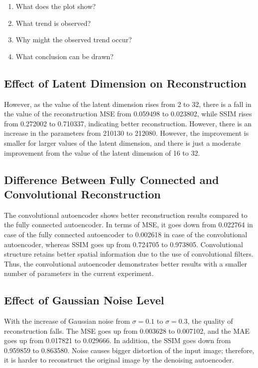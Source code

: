 \documentclass[10pt]{article}
\begin{document}
\begin{enumerate}
\item What does the plot show?
\item What trend is observed?
\item Why might the observed trend occur?
\item What conclusion can be drawn?
\end{enumerate}


\subsection*{Effect of Latent Dimension on Reconstruction}
However, as the value of the latent dimension rises from 2 to 32, there is a fall in the value of the reconstruction MSE from 0.059498 to 0.023802, while SSIM rises from 0.272002 to 0.710337, indicating better reconstruction. However, there is an increase in the parameters from 210130 to 212080. However, the improvement is smaller for larger values of the latent dimension, and there is just a moderate improvement from the value of the latent dimension of 16 to 32.

\subsection*{Difference Between Fully Connected and Convolutional Reconstruction}
The convolutional autoencoder shows better reconstruction results compared to the fully connected autoencoder. In terms of MSE, it goes down from 0.022764 in case of the fully connected autoencoder to 0.002618 in case of the convolutional autoencoder, whereas SSIM goes up from 0.724705 to 0.973805. Convolutional structure retains better spatial information due to the use of convolutional filters. Thus, the convolutional autoencoder demonstrates better results with a smaller number of parameters in the current experiment.

\subsection*{Effect of Gaussian Noise Level}
With the increase of Gaussian noise from $\sigma = 0.1$ to $\sigma = 0.3$, the quality of reconstruction falls. The MSE goes up from 0.003628 to 0.007102, and the MAE goes up from 0.017821 to 0.029666. In addition, the SSIM goes down from 0.959859 to 0.863580. Noise causes bigger distortion of the input image; therefore, it is harder to reconstruct the original image by the denoising autoencoder.
\end{document}
